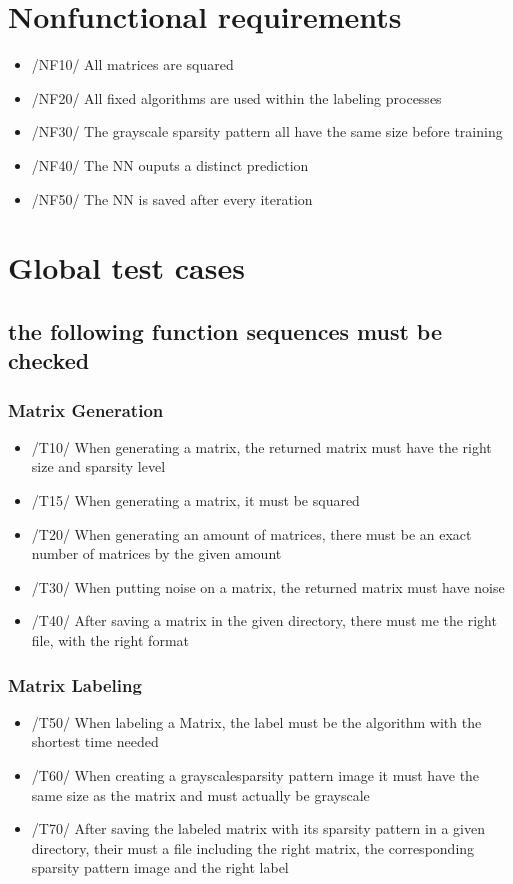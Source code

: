\documentclass[parskip=full]{scrartcl}
\begin{document}
\section{Nonfunctional requirements}
	\begin{itemize}
		\item /NF10/ All matrices are squared
		\item /NF20/ All fixed \glspl{algorithm} are used within the labeling processes
		\item /NF30/ The grayscale sparsity pattern all have the same size before training
		\item /NF40/ The NN ouputs a distinct prediction
		\item /NF50/ The NN is saved after every iteration
	\end{itemize}
	

\section{Global test cases}
\subsection{the following function sequences must be checked}
\subsubsection{Matrix Generation}
	\begin{itemize}
		\item /T10/ When generating a matrix, the returned matrix must have the right size and sparsity level
		\item /T15/ When generating a matrix, it must be squared
		\item /T20/ When generating an amount of matrices, there must be an exact number of matrices by the given amount
		\item /T30/ When putting noise on a matrix, the returned matrix must have noise
		\item /T40/ After saving a matrix in the given directory, there must me the right file, with the right format
	\end{itemize}

\subsubsection{Matrix Labeling}
		\begin{itemize}
		\item /T50/ When labeling a Matrix, the label must be the \gls{algorithm} with the shortest time needed
		\item /T60/ When creating a grayscale\gls{sparsity pattern image} it must have the same size as
                       the matrix and must actually be grayscale
		\item /T70/ After saving the labeled matrix with its sparsity pattern in a given directory, their must a file including the right matrix, the corresponding \gls{sparsity pattern image} and the right label
		\end{itemize}
\end{document}
